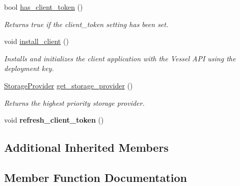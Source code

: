 \begin{DoxyCompactItemize}
bool \hyperlink{class_vessel_1_1_networking_1_1_vessel_client_af517d80b8e5a5941ee532faae46660be}{has\+\_\+client\+\_\+token} ()
\begin{DoxyCompactList}\small\item\em Returns true if the client\+\_\+token setting has been set. \end{DoxyCompactList}\item 
\mbox{\label{class_vessel_1_1_networking_1_1_vessel_client_a6f16e4d275f2a4e8e1671b825e708ceb}} 
void \hyperlink{class_vessel_1_1_networking_1_1_vessel_client_a6f16e4d275f2a4e8e1671b825e708ceb}{install\+\_\+client} ()
\begin{DoxyCompactList}\small\item\em Installs and initializes the client application with the Vessel A\+PI using the deployment key. \end{DoxyCompactList}\item 
\hyperlink{struct_vessel_1_1_types_1_1_storage_provider}{Storage\+Provider} \hyperlink{class_vessel_1_1_networking_1_1_vessel_client_abebbf619a43e9d72ba8b6a4868b396e3}{get\+\_\+storage\+\_\+provider} ()
\begin{DoxyCompactList}\small\item\em Returns the highest priority storage provider. \end{DoxyCompactList}\item 
\mbox{\label{class_vessel_1_1_networking_1_1_vessel_client_ae4c7ae341a369a4d310998a6a2eb76b9}} 
void {\bfseries refresh\+\_\+client\+\_\+token} ()
\end{DoxyCompactItemize}
\subsection*{Additional Inherited Members}


\subsection{Member Function Documentation}
\mbox{\label{class_vessel_1_1_networking_1_1_vessel_client_abebbf619a43e9d72ba8b6a4868b396e3}} 
